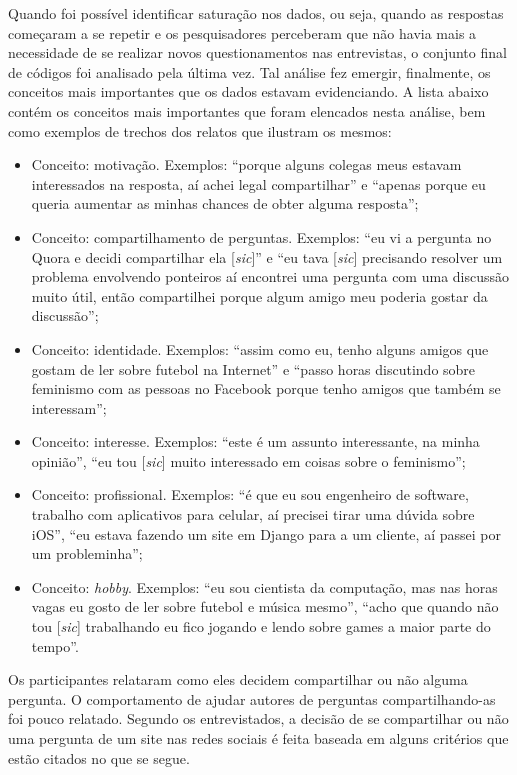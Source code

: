 Quando foi possível identificar saturação nos dados, ou seja, quando as respostas começaram a se repetir e os pesquisadores perceberam que não havia mais a necessidade de se realizar novos questionamentos nas entrevistas, o conjunto final de códigos foi analisado pela última vez. Tal análise fez emergir, finalmente, os conceitos mais importantes que os dados estavam evidenciando. A lista abaixo contém os conceitos mais importantes que foram elencados nesta análise, bem como exemplos de trechos dos relatos que ilustram os mesmos: 
\begin{itemize}
    \item Conceito: motivação. Exemplos: ``porque alguns colegas meus estavam interessados na resposta, aí achei legal compartilhar'' e ``apenas porque eu queria aumentar as minhas chances de obter alguma resposta'';
    \item Conceito: compartilhamento de perguntas. Exemplos: ``eu vi a pergunta no Quora e decidi compartilhar ela [\textit{sic}]''  e ``eu tava [\textit{sic}] precisando resolver um problema envolvendo ponteiros aí encontrei uma pergunta com uma discussão muito útil, então compartilhei porque algum amigo meu poderia gostar da discussão'';
    \item Conceito: identidade. Exemplos: ``assim como eu, tenho alguns amigos que gostam de ler sobre futebol na Internet'' e ``passo horas discutindo sobre feminismo com as pessoas no Facebook porque tenho amigos que também se interessam'';
    \item Conceito: interesse. Exemplos: ``este é um assunto interessante, na minha opinião'', ``eu tou [\textit{sic}] muito interessado em coisas sobre o feminismo'';
    \item Conceito: profissional. Exemplos: ``é que eu sou engenheiro de software, trabalho com aplicativos para celular, aí precisei tirar uma dúvida sobre iOS'', ``eu estava fazendo um site em Django para a um cliente, aí passei por um probleminha'';
    \item Conceito: \textit{hobby}. Exemplos: ``eu sou cientista da computação, mas nas horas vagas eu gosto de ler sobre futebol e música mesmo'', ``acho que quando não tou [\textit{sic}] trabalhando eu fico jogando e lendo sobre games a maior parte do tempo''.
\end{itemize}

Os participantes relataram como eles decidem compartilhar ou não alguma pergunta. O comportamento de ajudar autores de perguntas compartilhando-as foi pouco relatado. Segundo os entrevistados, a decisão de se compartilhar ou não uma pergunta de um site \qa nas redes sociais é feita baseada em alguns critérios que estão citados no que se segue.


